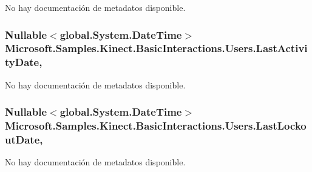 No hay documentación de metadatos disponible. 

\hypertarget{class_microsoft_1_1_samples_1_1_kinect_1_1_basic_interactions_1_1_users_aee708722af48c9a8d38f4570475c63e7}{
\subsubsection[{Last\-Activity\-Date}]{\setlength{\rightskip}{0pt plus 5cm}Nullable$<$global.\-System.\-Date\-Time$>$ Microsoft.\-Samples.\-Kinect.\-Basic\-Interactions.\-Users.\-Last\-Activity\-Date\hspace{0.3cm}{\ttfamily [get]}, {\ttfamily [set]}}}\label{class_microsoft_1_1_samples_1_1_kinect_1_1_basic_interactions_1_1_users_aee708722af48c9a8d38f4570475c63e7}


No hay documentación de metadatos disponible. 

\hypertarget{class_microsoft_1_1_samples_1_1_kinect_1_1_basic_interactions_1_1_users_aef20184e56d733efb0aa7cb090ce65a6}{
\subsubsection[{Last\-Lockout\-Date}]{\setlength{\rightskip}{0pt plus 5cm}Nullable$<$global.\-System.\-Date\-Time$>$ Microsoft.\-Samples.\-Kinect.\-Basic\-Interactions.\-Users.\-Last\-Lockout\-Date\hspace{0.3cm}{\ttfamily [get]}, {\ttfamily [set]}}}\label{class_microsoft_1_1_samples_1_1_kinect_1_1_basic_interactions_1_1_users_aef20184e56d733efb0aa7cb090ce65a6}


No hay documentación de metadatos disponible. 

